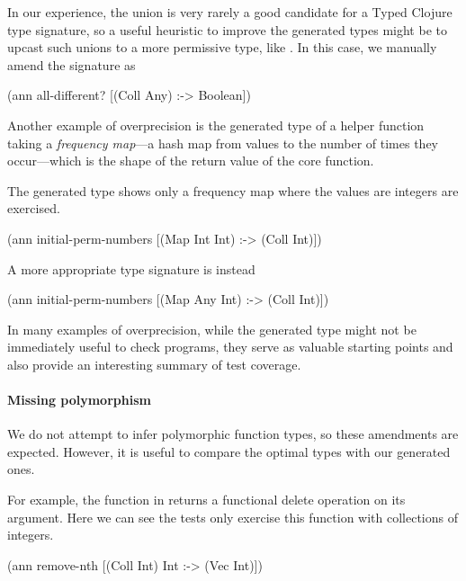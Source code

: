 In our experience, the union is very rarely a good candidate
for a Typed Clojure type signature, so a useful heuristic to improve
the generated types might be to upcast such unions to a more permissive
type, like . 
In this case, we manually amend the signature as

\begin{cljlisting}
(ann all-different? [(Coll Any) :-> Boolean])
\end{cljlisting}

Another example of overprecision is the generated type
of  a helper function
taking a \emph{frequency map}---a hash map from values
to the number of times they occur---which is the shape
of the return value of the core 
function.

The generated type shows only a frequency map where
the values are integers are exercised.

\begin{cljlisting}
(ann initial-perm-numbers [(Map Int Int) :-> (Coll Int)])
\end{cljlisting}

A more appropriate type signature is instead

\begin{cljlisting}
(ann initial-perm-numbers [(Map Any Int) :-> (Coll Int)])
\end{cljlisting}

In many examples of overprecision, while the generated
type might not be immediately useful to check programs,
they serve as valuable starting points and also provide
an interesting summary of test coverage.

\paragraph{Missing polymorphism}

We do not attempt to infer polymorphic function types, 
so these amendments are expected. However, it is useful
to compare the optimal types with our generated ones.

For example, the  function in 
returns a functional delete operation on its argument.
Here we can see the tests only exercise this function with
collections of integers.

\begin{cljlisting}
(ann remove-nth [(Coll Int) Int :-> (Vec Int)])
\end{cljlisting}

